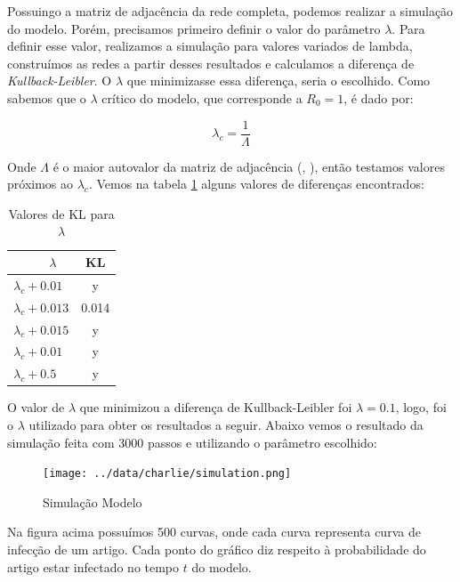 \documentclass[a4paper,12pt]{article}
\begin{document}
Possuingo a matriz de adjacência da rede completa, podemos realizar a simulação do modelo. Porém, precisamos primeiro definir o valor do 
parâmetro $\lambda$. Para definir esse valor, realizamos a simulação para valores variados de lambda, construímos as redes a partir desses
resultados e calculamos a diferença de \textit{Kullback-Leibler}. O $\lambda$ que minimizasse essa diferença, seria o escolhido. Como sabemos
que o $\lambda$ crítico do modelo, que corresponde a $R_{0}=1$, é dado por: 

$$\lambda_{c} = \dfrac{1}{\Lambda}$$

Onde $\Lambda$ é o maior autovalor da matriz de adjacência (\cite{wang2003proceedings}, \cite{chakrabarti2008epidemic}), então testamos
valores próximos ao $\lambda_{c}$. Vemos na tabela \ref{tabela:dist_kl} alguns valores de diferenças encontrados:


\begin{table}[ht]
\caption{Valores de KL para $\lambda$}
\label{tabela:dist_kl}
 \begin{center}
 \begin{tabular}{l|c}
   \ \ \ \ \ $\lambda$ & KL \\ \hline
   $\lambda_{c} + 0.01$ & y\\
   $\lambda_{c} + 0.013$ & 0.014 \\
   $\lambda_{c} + 0.015$ & y\\
   $\lambda_{c} + 0.01$ & y\\
   $\lambda_{c} + 0.5$ & y
 \end{tabular}
 \end{center}
\end{table}



O valor de $\lambda$ que minimizou a diferença de Kullback-Leibler foi $\lambda=0.1$, logo, foi o $\lambda$ utilizado para obter os
resultados a seguir. Abaixo vemos o resultado da simulação feita com 3000 passos e utilizando o parâmetro escolhido:


\begin{figure}[ht]
 \centering
 \texttt{[image: ../data/charlie/simulation.png]}
 \caption{Simulação Modelo}
\end{figure}

Na figura acima possuímos 500 curvas, onde cada curva representa curva de infecção de um artigo. Cada ponto do gráfico diz
respeito à probabilidade do artigo estar infectado no tempo $t$ do modelo. 
\end{document}
